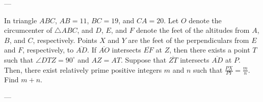 
---

In triangle $ABC$, $AB=11$, $BC=19$, and $CA=20$. Let $O$ denote the circumcenter of $\triangle ABC$, and $D$, $E$, and $F$ denote the feet of the altitudes from $A$, $B$, and $C$, respectively. Points $X$ and $Y$ are the feet of the perpendiculars from $E$ and $F$, respectively, to $\overline{AD}$. If $\overline{AO}$ intersects $\overline{EF}$ at $Z$, then there exists a point $T$ such that $\angle DTZ=90^\circ$ and $AZ=AT$. Suppose that $\overline{ZT}$ intersects $\overline{AD}$ at $P$. Then, there exist relatively prime positive integers $m$ and $n$ such that $\tfrac{PX}{PY}=\tfrac mn$. Find $m+n$.

---

